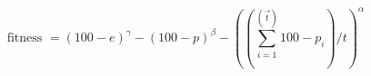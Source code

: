 \begin{equation}
    \text { fitness }=(100-e)^{\gamma}-(100-p)^{\beta}-\left(\left(\sum_{i=1}^{(\vec{t})} 100-p_{i}\right) / t\right)^{\alpha}
    \label{equations:fitness_function}
\end{equation}
